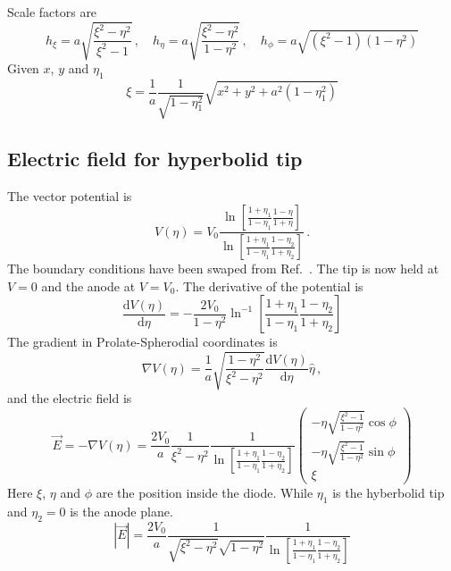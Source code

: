 \documentclass[a4paper,10pt]{article}
\newcommand{\ud}{\mathrm{d}}
\begin{document}
  Scale factors are
  \begin{equation}
    h_{\xi} = a \sqrt{ \frac{\xi^2-\eta^2}{\xi^2-1} }\,, \quad
    h_{\eta} = a \sqrt{ \frac{\xi^2-\eta^2}{1-\eta^2} }\,, \quad
    h_{\phi} = a \sqrt{ (\xi^2-1)(1-\eta^2) }
  \end{equation}
%
  Given \(x\), \(y\) and \(\eta_1\)
  \begin{equation}
   \xi = \frac{1}{a} \frac{1}{\sqrt{1-\eta_1^2}} \sqrt{x^2 + y^2 + a^2(1-\eta_1^2)}
  \end{equation}
%
%
\subsection{Electric field for hyperbolid tip}
  The vector potential is~\cite{pan:2151}
  \begin{equation}
    V(\eta) = V_0 \frac{\ln{\left[ \frac{1 + \eta_1}{1-\eta_1}\frac{1-\eta}{1+\eta} \right]}}{\ln{\left[ \frac{1+\eta_1}{1-\eta_1}\frac{1-\eta_2}{1+\eta_2} \right]}}\, .
  \end{equation}
  The boundary conditions have been swaped from Ref.~\parencite{pan:2151}. The tip is now held at \(V = 0\) and the anode at \(V = V_0\).
  The derivative of the potential is
  \begin{equation}
    \frac{\ud V(\eta)}{\ud \eta} = -\frac{2V_0}{1-\eta^2} \ln^{-1} \left[ \frac{1+\eta_1}{1-\eta_1} \frac{1-\eta_2}{1+\eta_2} \right]
  \end{equation}
  The gradient in Prolate-Spherodial coordinates is
  \begin{equation}
    \nabla V(\eta) = \frac{1}{a} \sqrt{\frac{1-\eta^2}{\xi^2-\eta^2}} \frac{\ud V(\eta)}{\ud \eta} \hat{\eta}\, ,
  \end{equation}
  and the electric field is
  \begin{equation}
   \vec{E} = - \nabla V(\eta) = \frac{2V_0}{a} \frac{1}{\xi^2-\eta^2} \frac{1}{\ln \left[ \frac{1+\eta_1}{1-\eta_1} \frac{1-\eta_2}{1+\eta_2} \right]}
                                \begin{pmatrix}
                                  -\eta \sqrt{\frac{\xi^2-1}{1-\eta^2}} \cos{\phi}\\
                                  -\eta \sqrt{\frac{\xi^2-1}{1-\eta^2}} \sin{\phi}\\
                                  \xi
                                \end{pmatrix}
  \end{equation}
  Here \(\xi\), \(\eta\) and \(\phi\) are the position inside the diode. While \(\eta_1\) is the hyberbolid tip and \(\eta_2 = 0\) is the anode plane.
  \begin{equation}
    |\vec{E}| = \frac{2V_0}{a} \frac{1}{\sqrt{\xi^2-\eta^2}\sqrt{1-\eta^2}} \frac{1}{\ln \left[ \frac{1+\eta_1}{1-\eta_1} \frac{1-\eta_2}{1+\eta_2} \right]}
  \end{equation}
\end{document}
